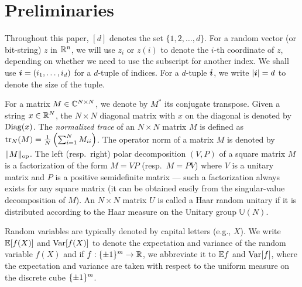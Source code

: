 \section{Preliminaries}\label{sec:prelims}


 Throughout this paper, $[d]$ denotes the set $\{1,2,\dotsc, d\}$. For a random vector (or bit-string) $z$ in ${\mathbb R}^n$, we will use $z_i$ or $z(i)$ to denote the $i$-th coordinate of $z$, depending on whether we need to use the subscript for another index. We shall use ${\boldsymbol{i}} = (i_1,\ldots, i_d)$ for a $d$-tuple of indices.  For a $d$-tuple ${\boldsymbol{i}}$, we write $|{\boldsymbol{i}}|=d$ to denote the size of the tuple.

 
 For a matrix $M \in \mathbb{C}^{N \times N}$, we denote by $M^*$ its conjugate transpose.
 Given a string $x \in {\mathbb R}^N$, the $N \times N$ diagonal matrix with $x$ on the diagonal is denoted by $\mathrm{Diag}(x)$. The \emph{normalized trace} of an $N \times N$ matrix $M$ is defined as $\mathrm{tr}_N(M) = \frac{1}{N} \left(\sum_{i=1}^N M_{ii}\right)$. The operator norm of a matrix $M$ is denoted by $\|M\|_{\mathrm{op}}$. The left (resp.\ right) polar decomposition $(V, P)$ of a square matrix $M$ is a factorization of the form $M=VP$ (resp.\ $M=PV$) where $V$ is a unitary matrix and $P$ is a positive semidefinite matrix --- such a factorization always exists for any square matrix (it can be obtained easily from the singular-value decomposition of $M$). An $N \times N$ matrix $U$ is called a Haar random unitary if it is distributed according to the Haar measure on the Unitary group $\mathbb{U}(N)$.
 
 
 
Random variables are typically denoted by capital letters (e.g., $X$). We write $\mathbb{E}[f(X)]$ and $\mathrm{Var}[f(X)]$ to denote the expectation and variance of the random variable $f(X)$ and if $f: \{\pm 1\}^m \to {\mathbb R}$, we abbreviate it to $\mathbb{E} f$ and $\mathrm{Var}[f]$, where the expectation and variance are taken with respect to the uniform measure on the discrete cube $\{\pm 1\}^m$. 
 



